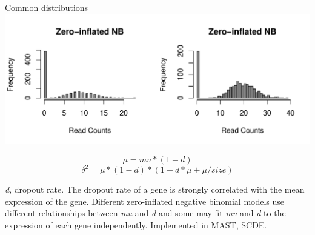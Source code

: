 \documentclass{beamer}\usepackage[]{graphicx}\usepackage[]{color}
\makeatletter
\def\maxwidth{ %
  \ifdim\Gin@nat@width>\linewidth
    \linewidth
  \else
    \Gin@nat@width
  \fi
}
\newenvironment{knitrout}{}{} %
\makeatother
\begin{document}
\begin{frame}
\begin{block}{Common distributions} %
\begin{knitrout}
\color{fgcolor}
\includegraphics[width=\maxwidth]{figure/dist-zero-inlated-NB-1} 

\end{knitrout}

\tiny
$$\mu=mu*(1-d)$$
$$\delta^2=\mu*(1-d)*(1+d*\mu+\mu/size)$$

\textit{d}, dropout rate. The dropout rate of a gene is strongly correlated with the mean expression of the gene. Different zero-inflated negative binomial models use different relationships between \textit{mu} and \textit{d} and some may fit \textit{mu} and \textit{d} to the expression of each gene independently. Implemented in MAST, SCDE. 
\end{block}
\end{frame}
\end{document}
